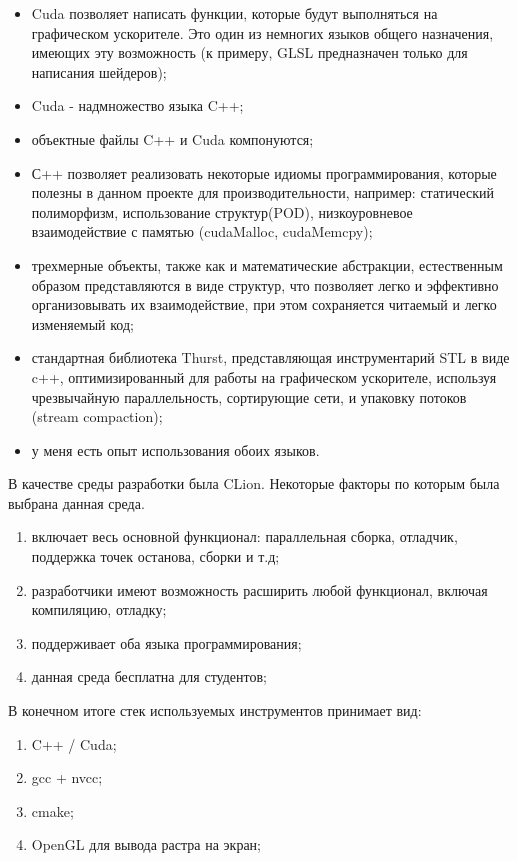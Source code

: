 \begin{itemize}
	\item Cuda позволяет написать функции, которые будут выполняться на графическом ускорителе. Это один из немногих языков общего назначения, имеющих эту возможность (к примеру, GLSL предназначен только для написания шейдеров);
	\item Cuda - надмножество языка C++;
	\item объектные файлы C++ и Cuda компонуются;
	\item С++ позволяет реализовать некоторые идиомы программирования, которые полезны в данном проекте для производительности, например: статический полиморфизм, использование структур(POD), низкоуровневое взаимодействие с памятью (cudaMalloc, cudaMemcpy);
	\item трехмерные объекты, также как и математические абстракции, естественным образом представляются в виде структур, что позволяет легко и эффективно организовывать их взаимодействие, при этом сохраняется читаемый и легко изменяемый код;
	\item стандартная библиотека Thurst, представляющая инструментарий STL в виде c++, оптимизированный для работы на графическом ускорителе, используя чрезвычайную параллельность, сортирующие сети, и упаковку потоков (stream compaction);
	\item у меня есть опыт использования обоих языков.
\end{itemize}

В качестве среды разработки была CLion. Некоторые факторы по которым была выбрана данная среда.
\begin{enumerate}
	\item включает весь основной функционал: параллельная сборка, отладчик, поддержка точек останова, сборки и т.д;
	\item разработчики имеют возможность расширить любой функционал, включая компиляцию, отладку;
	\item поддерживает оба языка программирования;
	\item данная среда бесплатна для студентов;
\end{enumerate}

В конечном итоге стек используемых инструментов принимает вид:
\begin{enumerate}
	\item C++ / Cuda;
	\item gcc + nvcc;
	\item cmake;
	\item OpenGL для вывода растра на экран;
\end{enumerate}

